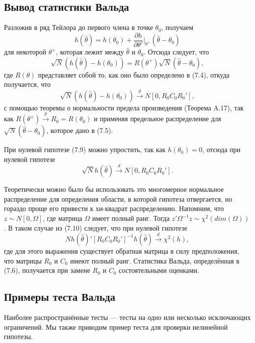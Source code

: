 \subsection{Вывод статистики Вальда}

Разложив в ряд Тейлора до первого члена в точке $\theta_0$, получаем
\[
h(\hat{\theta}) = h(\theta_0) + \frac{\partial{h}}{\partial{\theta'}}|_{\theta^{+}} (\hat{\theta} - \theta_0)
\]
для некоторой $\theta^{+}$, которая лежит между $\hat{\theta}$ и $\theta_0$. Отсюда следует, что
\[
\sqrt{N}(h(\hat{\theta}) - h(\theta_0)) = R(\theta^{+})\sqrt{N}(\hat{\theta} - \theta_0),
\]
где $R(\theta)$ представляет собой то, как оно было определено в (7.4), откуда получается, что
\begin{equation}
\sqrt{N}(h(\hat{\theta}) - h(\theta_0)) \stackrel{d}{\rightarrow} N[0, R_0C_0R_0'],
\end{equation}
с помощью теоремы о нормальности предела произведения (Теорема A.17), так как $R(\theta^{+}) \stackrel{p}{\rightarrow} R_0 = R(\theta_0)$ и применяя предельное распределение для $\sqrt{N}(\hat{\theta} - \theta_0)$, которое дано в (7.5).

При нулевой гипотезе (7.9) можно упростить, так как $h(\theta_0) = 0$, отсюда при нулевой гипотезе
\begin{equation}
\sqrt{N}h(\hat{\theta}) \stackrel{d}{\rightarrow} N[0, R_0C_0R_0'].
\end{equation}

Теоретически можно было бы использовать это многомерное нормальное распределение для определения области, в которой гипотеза отвергается, но гораздо проще его привести к хи-квадрат распределению. Напомним, что $z \sim N[0,\Omega]$, где матрица $\Omega$ имеет полный ранг. Тогда $z'\Omega^{-1}z \sim \chi^2(dim(\Omega))$. В таком случае из (7.10) следует, что при нулевой гипотезе
\[
Nh(\hat{\theta})'[R_0C_0R_0']^{-1}h(\hat{\theta}) \stackrel{d}{\rightarrow} \chi^2(h),
\]
где для этого выражения существует обратная матрица в силу предположения, что матрицы $R_0$ и $C_0$ имеют полный ранг. Статистика Вальда, определённая в (7.6), получается при замене $R_0$ и $C_0$ состоятельными оценками.

\subsection{Примеры теста Вальда}

Наиболее распространённые тесты --- тесты на одно или несколько исключающих ограничений. Мы также приводим пример теста для проверки нелинейной гипотезы.

